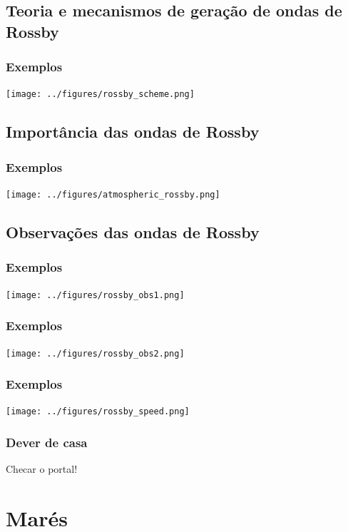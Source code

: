 \subsection{Teoria e mecanismos de geração de ondas de Rossby}
\begin{frame}
  \frametitle{Exemplos}
    \begin{center}
    \texttt{[image: ../figures/rossby\_scheme.png]}
  \end{center}
\end{frame}

\subsection{Importância das ondas de Rossby}
\begin{frame}
  \frametitle{Exemplos}
    \begin{center}
    \texttt{[image: ../figures/atmospheric\_rossby.png]}
  \end{center}
\end{frame}

\subsection{Observações das ondas de Rossby}
\begin{frame}
  \frametitle{Exemplos}
    \begin{center}
    \texttt{[image: ../figures/rossby\_obs1.png]}
  \end{center}
\end{frame}

\begin{frame}
  \frametitle{Exemplos}
    \begin{center}
    \texttt{[image: ../figures/rossby\_obs2.png]}
  \end{center}
\end{frame}


\begin{frame}
  \frametitle{Exemplos}
    \begin{center}
    \texttt{[image: ../figures/rossby\_speed.png]}
  \end{center}
\end{frame}


\begin{frame}
\frametitle{Dever de casa}
    Checar o portal!
\end{frame}
\section{Marés}


